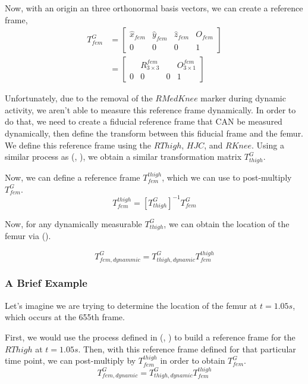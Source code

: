 \documentclass{IEEEtran}
\begin{document}
    Now, with an origin an three orthonormal basis vectors, we can create a reference frame,
    \begin{equation}
        \begin{aligned}
            T^{G}_{fem} &= \begin{bmatrix}
                \hat{x}_{fem} &\hat{y}_{fem} &\hat{z}_{fem} & O_{fem} \\
                0 & 0 & 0 & 1
            \end{bmatrix} \\
            &= \begin{bmatrix}
                & R^{fem}_{3 \times 3} & & O^{fem}_{3 \times 1} \\
                0 & 0 & 0 & 1
            \end{bmatrix}
        \end{aligned}
        \label{t_gf}
    \end{equation}

    Unfortunately, due to the removal of the $RMedKnee$ marker during dynamic activity, we aren't able to measure this reference frame dynamically. In order to do that, we need to create a fiducial reference frame that CAN be measured dynamically, then define the transform between this fiducial frame and the femur. We define this reference frame using the $RThigh$, $HJC$, and $RKnee$.
    Using a similar process as (, ), we obtain a similar transformation matrix $T^{G}_{thigh}$. 

    Now, we can define a reference frame $T^{thigh}_{fem}$, which we can use to post-multiply $T^{G}_{fem}$. 
    \begin{equation}
        T^{thigh}_{fem} = [T^{G}_{thigh}]^{-1}T^{G}_{fem}
    \end{equation}

    Now, for any dynamically measurable $T^{G}_{thigh}$, we can obtain the location of the femur via ().

    \begin{equation}
        T^{G}_{fem,dynammic} = T^{G}_{thigh,dynamic}T^{thigh}_{fem}
        \label{t_th_g_f}
    \end{equation}

    \begin{mdframed}
        \subsubsection*{A Brief Example}
        Let's imagine we are trying to determine the location of the femur at $t=1.05s$, which occurs at the 655th frame. 
        
        First, we would use the process defined in (, ) to build a reference frame for the $RThigh$ at $t = 1.05s$. Then, with this reference frame defined for that particular time point, we can post-multiply by $T^{thigh}_{fem}$ in order to obtain $T^{G}_{fem}$.
        \begin{equation}
            T^{G}_{fem,dynamic} = T^{G}_{thigh,dynamic}T^{thigh}_{fem}
        \end{equation}
    \end{mdframed}
\end{document}
